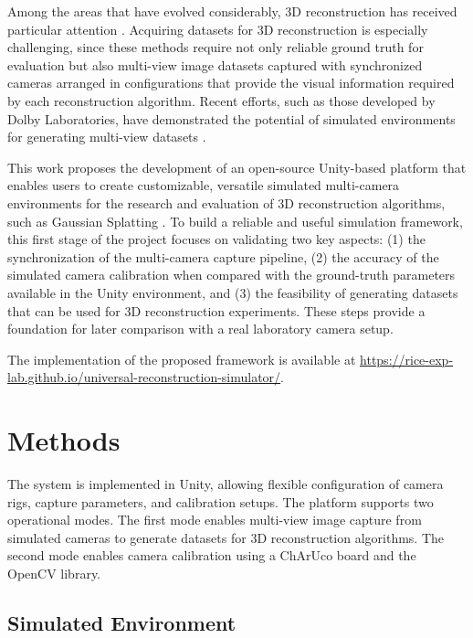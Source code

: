 \documentclass[conference]{IEEEtran}
\begin{document}
Among the areas that have evolved considerably, 3D reconstruction has received particular attention \cite{overview}. Acquiring datasets for 3D reconstruction is especially challenging, since these methods require not only reliable ground truth for evaluation but also multi-view image datasets captured with synchronized cameras arranged in configurations that provide the visual information required by each reconstruction algorithm. Recent efforts, such as those developed by Dolby Laboratories, have demonstrated the potential of simulated environments for generating multi-view datasets \cite{volucapture}.

This work proposes the development of an open-source Unity-based platform that enables users to create customizable, versatile simulated multi-camera environments for the research and evaluation of 3D reconstruction algorithms, such as Gaussian Splatting \cite{3dgs}. To build a reliable and useful simulation framework, this first stage of the project focuses on validating two key aspects: (1) the synchronization of the multi-camera capture pipeline, (2) the accuracy of the simulated camera calibration when compared with the ground-truth parameters available in the Unity environment, and (3) the feasibility of generating datasets that can be used for 3D reconstruction experiments. These steps provide a foundation for later comparison with a real laboratory camera setup.

The implementation of the proposed framework is available at
\href{https://rice-exp-lab.github.io/universal-reconstruction-simulator/}{https://rice-exp-lab.github.io/universal-reconstruction-simulator/}.


\section{Methods}

The system is implemented in Unity, allowing flexible configuration of camera rigs, capture parameters, and calibration setups. The platform supports two operational modes. The first mode enables multi-view image capture from simulated cameras to generate datasets for 3D reconstruction algorithms. The second mode enables camera calibration using a ChArUco board and the OpenCV library.

\subsection{Simulated Environment}
\end{document}
